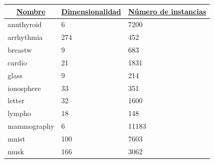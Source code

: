 \begin{table}[H]
	\centering
	\begin{tabular}{|l|l|l|}
		\hline
		\multicolumn{1}{|c|}{{\ul \textbf{Nombre}}} & \multicolumn{1}{c|}{{\ul \textbf{Dimensionalidad}}} & \multicolumn{1}{c|}{{\ul \textbf{Número de instancias}}} \\ \hline
		annthyroid                                  & 6                                                   & 7200                                                     \\ \hline
		arrhythmia                                  & 274                                                 & 452                                                      \\ \hline
		breastw                                     & 9                                                   & 683                                                      \\ \hline
		cardio                                      & 21                                                  & 1831                                                     \\ \hline
		glass                                       & 9                                                   & 214                                                      \\ \hline
		ionosphere                                  & 33                                                  & 351                                                      \\ \hline
		letter                                      & 32                                                  & 1600                                                     \\ \hline
		lympho                                      & 18                                                  & 148                                                      \\ \hline
		mammography                                 & 6                                                   & 11183                                                    \\ \hline
		mnist                                       & 100                                                 & 7603                                                     \\ \hline
		musk                                        & 166                                                 & 3062                                                     \\ \hline

\end{tabular}
\end{table}
